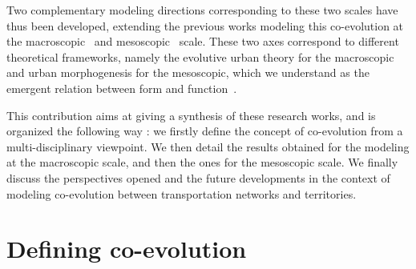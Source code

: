 \documentclass[11pt]{article}
\begin{document}
Two complementary modeling directions corresponding to these two scales have thus been developed, extending the previous works modeling this co-evolution at the macroscopic~\citep{baptistemodeling,schmitt2014modelisation} and mesoscopic~\citep{raimbault2014hybrid} scale. These two axes correspond to different theoretical frameworks, namely the evolutive urban theory for the macroscopic \citep{pumain2018evolutionary} and urban morphogenesis for the mesoscopic, which we understand as the emergent relation between form and function~\citep{doursat2012morphogenetic}.


This contribution aims at giving a synthesis of these research works, and is organized the following way : we firstly define the concept of co-evolution from a multi-disciplinary viewpoint. We then detail the results obtained for the modeling at the macroscopic scale, and then the ones for the mesoscopic scale. We finally discuss the perspectives opened and the future developments in the context of modeling co-evolution between transportation networks and territories.





\section{Defining co-evolution}
\end{document}
